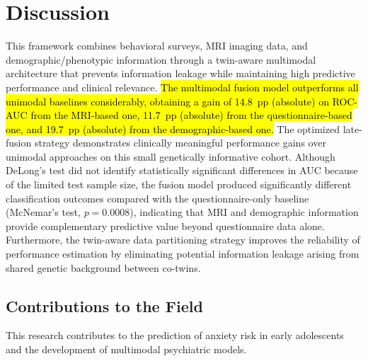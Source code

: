 \documentclass[10pt,letterpaper]{article}
\begin{document}
                                                                                                                          \section*{Discussion}
                                                                                                                          This framework combines behavioral surveys, MRI imaging data, and demographic/phenotypic information through a twin-aware multimodal architecture that prevents information leakage while maintaining high predictive performance and clinical relevance. \hl{The multimodal fusion model outperforms all unimodal baselines considerably, obtaining a gain of 14.8~pp (absolute) on ROC-AUC from the MRI-based one, 11.7~pp (absolute) from the questionnaire-based one, and 19.7~pp (absolute) from the demographic-based one.} The optimized late-fusion strategy demonstrates clinically meaningful performance gains over unimodal approaches on this small genetically informative cohort. Although DeLong's test did not identify statistically significant differences in AUC because of the limited test sample size, the fusion model produced significantly different classification outcomes compared with the questionnaire-only baseline (McNemar's test, $p = 0.0008$), indicating that MRI and demographic information provide complementary predictive value beyond questionnaire data alone. Furthermore, the twin-aware data partitioning strategy improves the reliability of performance estimation by eliminating potential information leakage arising from shared genetic background between co-twins.

                                                                                                                          \subsection*{Contributions to the Field}

                                                                                                                          This research contributes to the prediction of anxiety risk in early
                                                                                                                          adolescents and the development of multimodal psychiatric models.
\end{document}
